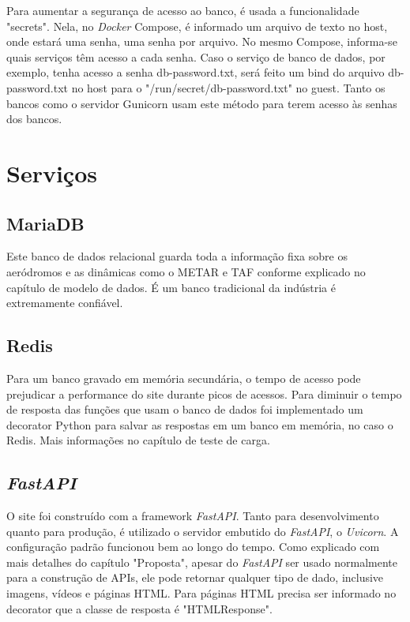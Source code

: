 Para aumentar a segurança de acesso ao banco, é usada a funcionalidade "secrets". Nela, no \textit{Docker} Compose,
é informado um arquivo de texto no host, onde estará uma senha, uma senha por arquivo. No mesmo Compose,
informa-se quais serviços têm acesso a cada senha. Caso o serviço de banco de dados, por exemplo, tenha
acesso a senha db-password.txt, será feito um bind do arquivo db-password.txt no host para o "/run/secret/db-password.txt"
no guest.
Tanto os bancos como o servidor Gunicorn usam este método para terem acesso às senhas dos bancos.

\section{Serviços}

\subsection{MariaDB}
Este banco de dados relacional guarda toda a informação fixa sobre os aeródromos e as dinâmicas
como o METAR e TAF conforme explicado no capítulo de modelo de dados. É um banco tradicional
da indústria é extremamente confiável.

\subsection{Redis}
Para um banco gravado em memória secundária, o tempo de acesso pode prejudicar a 
performance do site durante picos de acessos. Para diminuir o tempo de resposta das
funções que usam o banco
de dados foi implementado um decorator Python para salvar as respostas em um banco
em memória, no caso o Redis. Mais informações no capítulo de teste de carga.

\subsection{\textit{FastAPI}}

O site foi construído com a framework \textit{FastAPI}. Tanto para desenvolvimento quanto para produção, 
é utilizado o servidor embutido do \textit{FastAPI}, o \textit{Uvicorn}. A configuração padrão funcionou bem ao
longo do tempo. Como explicado com mais detalhes do capítulo "Proposta", apesar do \textit{FastAPI} ser
usado normalmente para a construção de APIs, ele pode retornar qualquer tipo de dado, inclusive
imagens, vídeos e páginas HTML. Para páginas HTML precisa ser informado no decorator que a
classe de resposta é "HTMLResponse".

